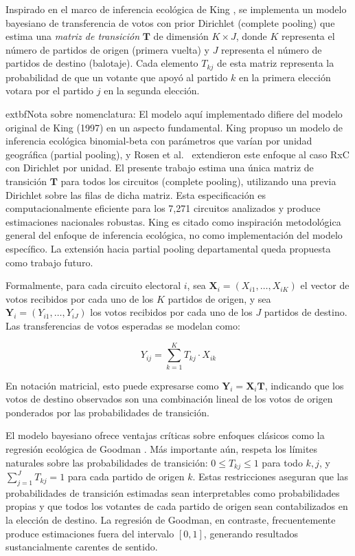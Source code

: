 Inspirado en el marco de inferencia ecológica de King \cite{king1997}, se implementa un modelo bayesiano de transferencia de votos con prior Dirichlet (complete pooling) que estima una \textit{matriz de transición} $\mathbf{T}$ de dimensión $K \times J$, donde $K$ representa el número de partidos de origen (primera vuelta) y $J$ representa el número de partidos de destino (balotaje). Cada elemento $T_{kj}$ de esta matriz representa la probabilidad de que un votante que apoyó al partido $k$ en la primera elección votara por el partido $j$ en la segunda elección.

	extbf{Nota sobre nomenclatura}: El modelo aquí implementado difiere del modelo original de King (1997) en un aspecto fundamental. King propuso un modelo de inferencia ecológica binomial-beta con parámetros que varían por unidad geográfica (partial pooling), y Rosen et al.\ \cite{rosen2001bayesian} extendieron este enfoque al caso RxC con Dirichlet por unidad. El presente trabajo estima una única matriz de transición $\mathbf{T}$ para todos los circuitos (complete pooling), utilizando una previa Dirichlet sobre las filas de dicha matriz. Esta especificación es computacionalmente eficiente para los 7{,}271 circuitos analizados y produce estimaciones nacionales robustas. King es citado como inspiración metodológica general del enfoque de inferencia ecológica, no como implementación del modelo específico. La extensión hacia partial pooling departamental queda propuesta como trabajo futuro.


Formalmente, para cada circuito electoral $i$, sea $\mathbf{X}_i = (X_{i1}, \ldots, X_{iK})$ el vector de votos recibidos por cada uno de los $K$ partidos de origen, y sea $\mathbf{Y}_i = (Y_{i1}, \ldots, Y_{iJ})$ los votos recibidos por cada uno de los $J$ partidos de destino. Las transferencias de votos esperadas se modelan como:

\begin{equation}
\label{eq:transferencias_esperadas}
Y_{ij} = \sum_{k=1}^{K} T_{kj} \cdot X_{ik}
\end{equation}

En notación matricial, esto puede expresarse como $\mathbf{Y}_i = \mathbf{X}_i \mathbf{T}$, indicando que los votos de destino observados son una combinación lineal de los votos de origen ponderados por las probabilidades de transición.

El modelo bayesiano ofrece ventajas críticas sobre enfoques clásicos como la regresión ecológica de Goodman \cite{king1997}. Más importante aún, respeta los límites naturales sobre las probabilidades de transición: $0 \leq T_{kj} \leq 1$ para todo $k,j$, y $\sum_{j=1}^{J} T_{kj} = 1$ para cada partido de origen $k$. Estas restricciones aseguran que las probabilidades de transición estimadas sean interpretables como probabilidades propias y que todos los votantes de cada partido de origen sean contabilizados en la elección de destino. La regresión de Goodman, en contraste, frecuentemente produce estimaciones fuera del intervalo $[0,1]$, generando resultados sustancialmente carentes de sentido.

